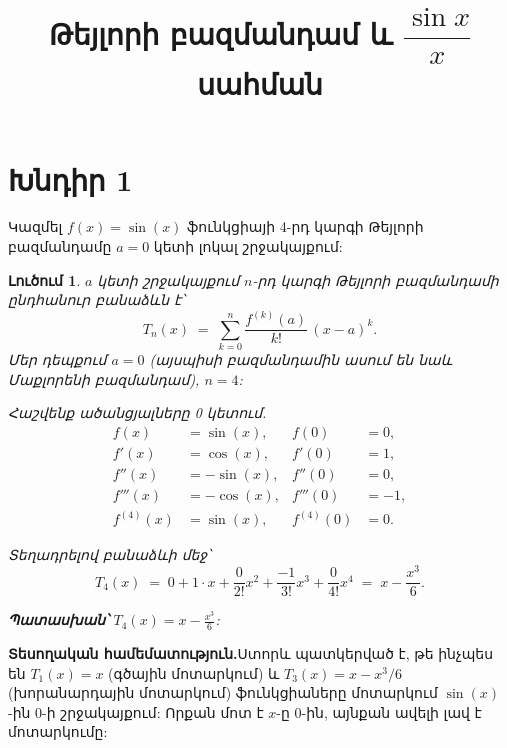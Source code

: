 \documentclass[11pt,a4paper]{article}
\title{Թեյլորի բազմանդամ և $\dfrac{\sin x}{x}$ սահման}
\author{}
\date{}
\theoremstyle{solstyle}
\newtheorem*{solution}{Լուծում}
\begin{document}
\maketitle

\section*{Խնդիր 1}
Կազմել $f(x) = \sin(x)$ ֆունկցիայի 4-րդ կարգի Թեյլորի բազմանդամը $a=0$ կետի լոկալ շրջակայքում:

\begin{solution}
$a$ կետի շրջակայքում $n$-րդ կարգի Թեյլորի բազմանդամի ընդհանուր բանաձևն է՝
\[
T_n(x) \;=\; \sum_{k=0}^{n} \frac{f^{(k)}(a)}{k!}\,(x-a)^k.
\]
Մեր դեպքում $a = 0$ (այսպիսի բազմանդամին ասում են նաև Մաքլորենի բազմանդամ), $n = 4$:

\medskip
Հաշվենք ածանցյալները 0 կետում.
\begin{align*}
f(x)       &= \sin(x),  & f(0)        &= 0, \\
f'(x)      &= \cos(x),  & f'(0)       &= 1, \\
f''(x)     &= -\sin(x), & f''(0)      &= 0, \\
f'''(x)    &= -\cos(x), & f'''(0)     &= -1, \\
f^{(4)}(x) &= \sin(x),  & f^{(4)}(0)  &= 0.
\end{align*}

\medskip
Տեղադրելով բանաձևի մեջ՝
\[
T_4(x) \;=\; 0 + 1\cdot x + \frac{0}{2!}x^2 + \frac{-1}{3!}x^3 + \frac{0}{4!}x^4
\;=\; x - \frac{x^3}{6}.
\]

\medskip
\textbf{Պատասխան՝} $\displaystyle T_4(x) = x - \frac{x^3}{6}$:
\end{solution}

\bigskip
\noindent\textbf{Տեսողական համեմատություն.}\quad Ստորև պատկերված է, թե ինչպես են $T_1(x)=x$ (գծային մոտարկում) և $T_3(x)=x-x^3/6$ (խորանարդային մոտարկում) ֆունկցիաները մոտարկում $\sin(x)$-ին 0-ի շրջակայքում: Որքան մոտ է $x$-ը 0-ին, այնքան ավելի լավ է մոտարկումը:

\begin{center}
\end{center}
\end{document}
